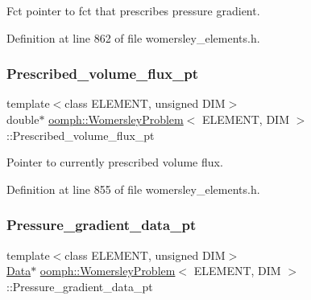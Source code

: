 Fct pointer to fct that prescribes pressure gradient. 



Definition at line 862 of file womersley\+\_\+elements.\+h.

\mbox{\label{classoomph_1_1WomersleyProblem_a8880c101a67eb960adac41775ebf2029}} 
\subsubsection{\texorpdfstring{Prescribed\+\_\+volume\+\_\+flux\+\_\+pt}{Prescribed\_volume\_flux\_pt}}
{\footnotesize\ttfamily template$<$class E\+L\+E\+M\+E\+NT, unsigned D\+IM$>$ \\
double$\ast$ \hyperlink{classoomph_1_1WomersleyProblem}{oomph\+::\+Womersley\+Problem}$<$ E\+L\+E\+M\+E\+NT, D\+IM $>$\+::Prescribed\+\_\+volume\+\_\+flux\+\_\+pt\hspace{0.3cm}{\ttfamily [private]}}



Pointer to currently prescribed volume flux. 



Definition at line 855 of file womersley\+\_\+elements.\+h.

\mbox{\label{classoomph_1_1WomersleyProblem_ad82799a978674bc9f49ac3240d43c34d}} 
\subsubsection{\texorpdfstring{Pressure\+\_\+gradient\+\_\+data\+\_\+pt}{Pressure\_gradient\_data\_pt}}
{\footnotesize\ttfamily template$<$class E\+L\+E\+M\+E\+NT, unsigned D\+IM$>$ \\
\hyperlink{classoomph_1_1Data}{Data}$\ast$ \hyperlink{classoomph_1_1WomersleyProblem}{oomph\+::\+Womersley\+Problem}$<$ E\+L\+E\+M\+E\+NT, D\+IM $>$\+::Pressure\+\_\+gradient\+\_\+data\+\_\+pt\hspace{0.3cm}{\ttfamily [private]}}



